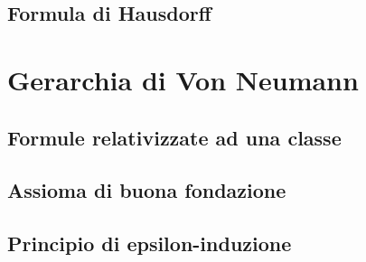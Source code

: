 \documentclass[11pt]{scrartcl}
\begin{document}
\subsection{Formula di Hausdorff}






\newpage
\section{Gerarchia di Von Neumann}
\subsection{Formule relativizzate ad una classe}
\newpage
\subsection{Assioma di buona fondazione}
\newpage
\subsection{Principio di epsilon-induzione}
\end{document}
